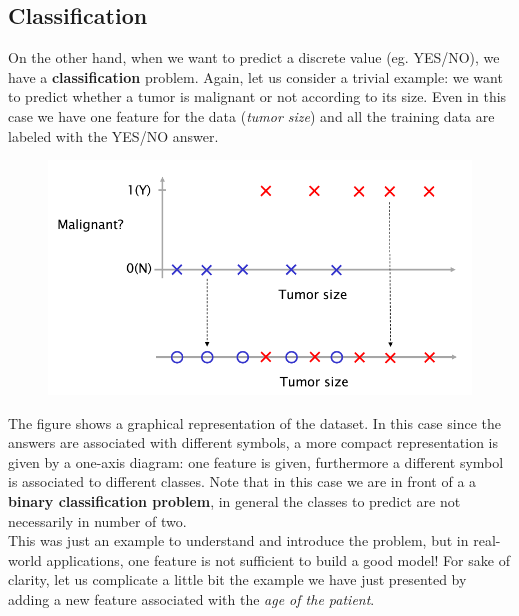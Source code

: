\subsection{Classification}
On the other hand, when we want to predict a discrete value (eg. YES/NO), we have a \textbf{classification} problem. Again, let us consider a trivial example: we want to predict whether a tumor is malignant or not according to its size. Even in this case we have one feature for the data (\textit{tumor size}) and all the training data are labeled with the YES/NO answer.

\begin{figure}[h]
    \centering
    \includegraphics[scale=0.5]{img/tumor.png}
\end{figure}

The figure shows a graphical representation of the dataset. In this case since the answers are associated with different symbols, a more compact representation is given by a one-axis diagram: one feature is given, furthermore a different symbol is associated to different classes. Note that in this case we are in front of a a \textbf{binary classification problem}, in general the classes to predict are not necessarily in number of two. \\
This was just an example to understand and introduce the problem, but in real-world applications, one feature is not sufficient to build a good model! For sake of clarity, let us complicate a little bit the example we have just presented by adding a new feature associated with the \textit{age of the patient}.

